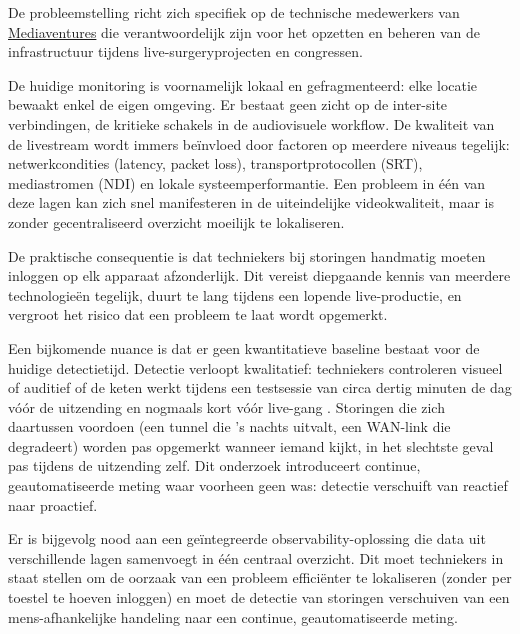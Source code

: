 De probleemstelling richt zich specifiek op de technische medewerkers van \href{https://mediaventures.be/}{Mediaventures} die verantwoordelijk zijn voor het opzetten en beheren van de infrastructuur tijdens live-surgeryprojecten en congressen.

De huidige monitoring is voornamelijk lokaal en gefragmenteerd: elke locatie bewaakt enkel de eigen omgeving. Er bestaat geen zicht op de inter-site verbindingen, de kritieke schakels in de audiovisuele workflow. De kwaliteit van de livestream wordt immers beïnvloed door factoren op meerdere niveaus tegelijk: netwerkcondities (latency, packet loss), transportprotocollen (SRT), mediastromen (NDI) en lokale systeemperformantie. Een probleem in één van deze lagen kan zich snel manifesteren in de uiteindelijke videokwaliteit, maar is zonder gecentraliseerd overzicht moeilijk te lokaliseren.

De praktische consequentie is dat techniekers bij storingen handmatig moeten inloggen op elk apparaat afzonderlijk. Dit vereist diepgaande kennis van meerdere technologieën tegelijk, duurt te lang tijdens een lopende live-productie, en vergroot het risico dat een probleem te laat wordt opgemerkt.

Een bijkomende nuance is dat er geen kwantitatieve baseline bestaat voor de huidige detectietijd. Detectie verloopt kwalitatief: techniekers controleren visueel of auditief of de keten werkt tijdens een testsessie van circa dertig minuten de dag vóór de uitzending en nogmaals kort vóór live-gang \autocite{VanRenterghem2025}. Storingen die zich daartussen voordoen (een tunnel die 's nachts uitvalt, een WAN-link die degradeert) worden pas opgemerkt wanneer iemand kijkt, in het slechtste geval pas tijdens de uitzending zelf. Dit onderzoek introduceert continue, geautomatiseerde meting waar voorheen geen was: detectie verschuift van reactief naar proactief.

Er is bijgevolg nood aan een geïntegreerde observability-oplossing die data uit verschillende lagen samenvoegt in één centraal overzicht. Dit moet techniekers in staat stellen om de oorzaak van een probleem efficiënter te lokaliseren (zonder per toestel te hoeven inloggen) en moet de detectie van storingen verschuiven van een mens-afhankelijke handeling naar een continue, geautomatiseerde meting.

\section{}%
\label{sec:onderzoeksvraag}

